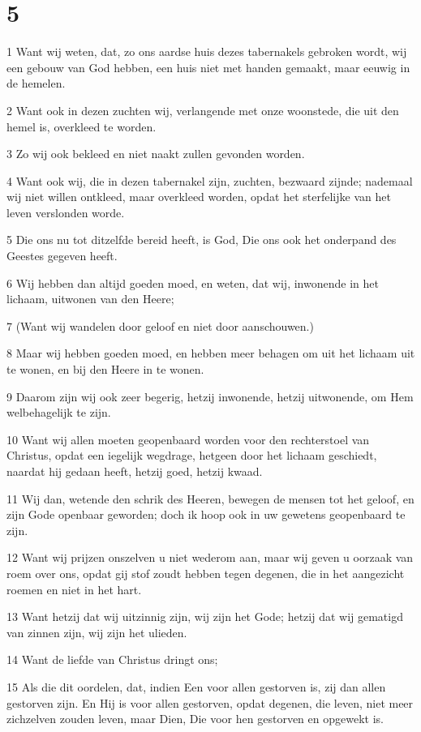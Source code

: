 \chapter{5}

\par 1 Want wij weten, dat, zo ons aardse huis dezes tabernakels gebroken wordt, wij een gebouw van God hebben, een huis niet met handen gemaakt, maar eeuwig in de hemelen.
\par 2 Want ook in dezen zuchten wij, verlangende met onze woonstede, die uit den hemel is, overkleed te worden.
\par 3 Zo wij ook bekleed en niet naakt zullen gevonden worden.
\par 4 Want ook wij, die in dezen tabernakel zijn, zuchten, bezwaard zijnde; nademaal wij niet willen ontkleed, maar overkleed worden, opdat het sterfelijke van het leven verslonden worde.
\par 5 Die ons nu tot ditzelfde bereid heeft, is God, Die ons ook het onderpand des Geestes gegeven heeft.
\par 6 Wij hebben dan altijd goeden moed, en weten, dat wij, inwonende in het lichaam, uitwonen van den Heere;
\par 7 (Want wij wandelen door geloof en niet door aanschouwen.)
\par 8 Maar wij hebben goeden moed, en hebben meer behagen om uit het lichaam uit te wonen, en bij den Heere in te wonen.
\par 9 Daarom zijn wij ook zeer begerig, hetzij inwonende, hetzij uitwonende, om Hem welbehagelijk te zijn.
\par 10 Want wij allen moeten geopenbaard worden voor den rechterstoel van Christus, opdat een iegelijk wegdrage, hetgeen door het lichaam geschiedt, naardat hij gedaan heeft, hetzij goed, hetzij kwaad.
\par 11 Wij dan, wetende den schrik des Heeren, bewegen de mensen tot het geloof, en zijn Gode openbaar geworden; doch ik hoop ook in uw gewetens geopenbaard te zijn.
\par 12 Want wij prijzen onszelven u niet wederom aan, maar wij geven u oorzaak van roem over ons, opdat gij stof zoudt hebben tegen degenen, die in het aangezicht roemen en niet in het hart.
\par 13 Want hetzij dat wij uitzinnig zijn, wij zijn het Gode; hetzij dat wij gematigd van zinnen zijn, wij zijn het ulieden.
\par 14 Want de liefde van Christus dringt ons;
\par 15 Als die dit oordelen, dat, indien Een voor allen gestorven is, zij dan allen gestorven zijn. En Hij is voor allen gestorven, opdat degenen, die leven, niet meer zichzelven zouden leven, maar Dien, Die voor hen gestorven en opgewekt is.
